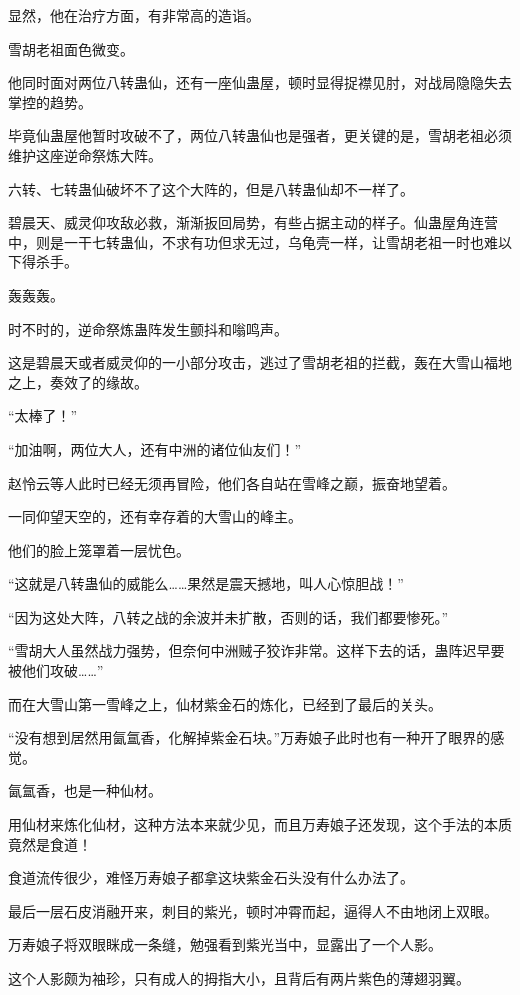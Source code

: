 \begin{this_body}
显然，他在治疗方面，有非常高的造诣。

雪胡老祖面色微变。

他同时面对两位八转蛊仙，还有一座仙蛊屋，顿时显得捉襟见肘，对战局隐隐失去掌控的趋势。

毕竟仙蛊屋他暂时攻破不了，两位八转蛊仙也是强者，更关键的是，雪胡老祖必须维护这座逆命祭炼大阵。

六转、七转蛊仙破坏不了这个大阵的，但是八转蛊仙却不一样了。

碧晨天、威灵仰攻敌必救，渐渐扳回局势，有些占据主动的样子。仙蛊屋角连营中，则是一干七转蛊仙，不求有功但求无过，乌龟壳一样，让雪胡老祖一时也难以下得杀手。

轰轰轰。

时不时的，逆命祭炼蛊阵发生颤抖和嗡鸣声。

这是碧晨天或者威灵仰的一小部分攻击，逃过了雪胡老祖的拦截，轰在大雪山福地之上，奏效了的缘故。

“太棒了！”

“加油啊，两位大人，还有中洲的诸位仙友们！”

赵怜云等人此时已经无须再冒险，他们各自站在雪峰之巅，振奋地望着。

一同仰望天空的，还有幸存着的大雪山的峰主。

他们的脸上笼罩着一层忧色。

“这就是八转蛊仙的威能么……果然是震天撼地，叫人心惊胆战！”

“因为这处大阵，八转之战的余波并未扩散，否则的话，我们都要惨死。”

“雪胡大人虽然战力强势，但奈何中洲贼子狡诈非常。这样下去的话，蛊阵迟早要被他们攻破……”

而在大雪山第一雪峰之上，仙材紫金石的炼化，已经到了最后的关头。

“没有想到居然用氤氲香，化解掉紫金石块。”万寿娘子此时也有一种开了眼界的感觉。

氤氲香，也是一种仙材。

用仙材来炼化仙材，这种方法本来就少见，而且万寿娘子还发现，这个手法的本质竟然是食道！

食道流传很少，难怪万寿娘子都拿这块紫金石头没有什么办法了。

最后一层石皮消融开来，刺目的紫光，顿时冲霄而起，逼得人不由地闭上双眼。

万寿娘子将双眼眯成一条缝，勉强看到紫光当中，显露出了一个人影。

这个人影颇为袖珍，只有成人的拇指大小，且背后有两片紫色的薄翅羽翼。


\end{this_body}
